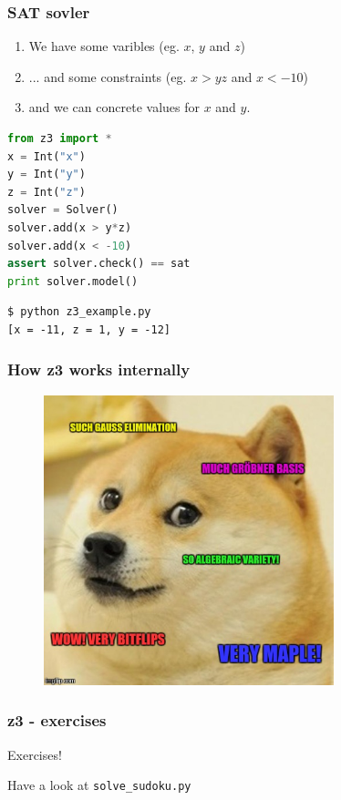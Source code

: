 \documentclass{beamer}
\begin{document}
\begin{frame}[fragile]
    \frametitle{SAT sovler}

    \begin{enumerate}
        \pause \item We have some varibles (eg. $x$, $y$ and $z$)
        \pause \item ... and some constraints (eg. $x > y z$ and $x < -10$)
        \pause \item and we can concrete values for $x$ and $y$.
    \end{enumerate}

    \pause
    \begin{lstlisting}[language=python]
from z3 import *
x = Int("x")
y = Int("y")
z = Int("z")
solver = Solver()
solver.add(x > y*z)
solver.add(x < -10)
assert solver.check() == sat
print solver.model()
    \end{lstlisting}

    \pause
    \begin{lstlisting}
$ python z3_example.py 
[x = -11, z = 1, y = -12]
    \end{lstlisting}
\end{frame}


\begin{frame}
    \frametitle{How z3 works internally}
    \pause 
    \begin{figure}[h]
        \includegraphics[width=0.75\textwidth]{z3doge}
    \end{figure}
\end{frame}


\begin{frame}
    \frametitle{z3 - exercises}
    \begin{center}
        {\Huge Exercises!}
    \end{center}
    Have a look at \texttt{solve\_sudoku.py}
\end{frame}
\end{document}
